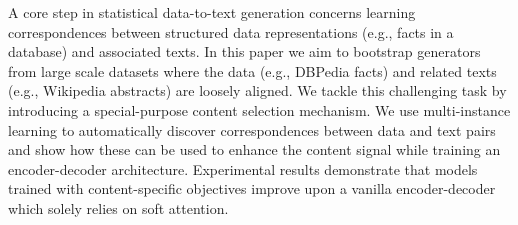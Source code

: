 A core step in statistical data-to-text generation concerns learning correspondences between structured data representations (e.g., facts in a database) and associated texts. In this paper we aim to bootstrap generators from large scale datasets where the data (e.g., DBPedia facts) and related texts (e.g., Wikipedia abstracts) are loosely aligned. We tackle this challenging task by introducing a special-purpose content selection mechanism. We use multi-instance learning to automatically discover correspondences between data and text pairs and show how these can be used to enhance the content signal while training an encoder-decoder architecture. Experimental results demonstrate that models trained with content-specific objectives improve upon a vanilla encoder-decoder which solely relies on soft attention.

